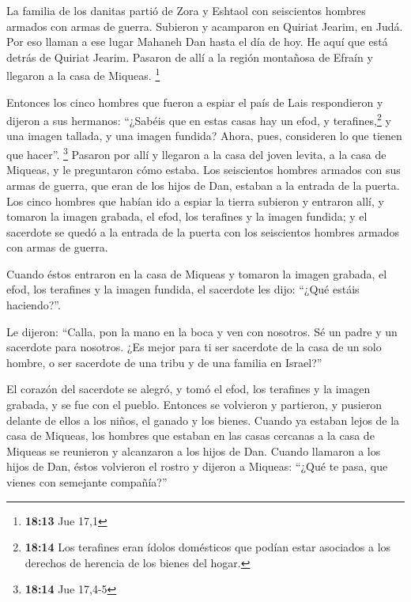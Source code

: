 \begin{paracol}{2}
 La familia de los danitas partió de Zora y Eshtaol con
seiscientos hombres armados con armas de guerra. 
Subieron y acamparon en Quiriat Jearim, en Judá. Por eso llaman a ese
lugar Mahaneh Dan hasta el día de hoy. He aquí que está detrás de
Quiriat Jearim.  Pasaron de allí a la región montañosa de
Efraín y llegaron a la casa de Miqueas. \footnote{\textbf{18:13} Jue
  17,1}

 Entonces los cinco hombres que fueron a espiar el país
de Lais respondieron y dijeron a sus hermanos: ``¿Sabéis que en estas
casas hay un efod, y terafines,\footnote{\textbf{18:14} Los terafines
  eran ídolos domésticos que podían estar asociados a los derechos de
  herencia de los bienes del hogar.} y una imagen tallada, y una imagen
fundida? Ahora, pues, consideren lo que tienen que hacer''. \footnote{\textbf{18:14}
  Jue 17,4-5}  Pasaron por allí y llegaron a la casa del
joven levita, a la casa de Miqueas, y le preguntaron cómo estaba.
 Los seiscientos hombres armados con sus armas de guerra,
que eran de los hijos de Dan, estaban a la entrada de la puerta.
 Los cinco hombres que habían ido a espiar la tierra
subieron y entraron allí, y tomaron la imagen grabada, el efod, los
terafines y la imagen fundida; y el sacerdote se quedó a la entrada de
la puerta con los seiscientos hombres armados con armas de guerra.

 Cuando éstos entraron en la casa de Miqueas y tomaron la
imagen grabada, el efod, los terafines y la imagen fundida, el sacerdote
les dijo: ``¿Qué estáis haciendo?''.

 Le dijeron: ``Calla, pon la mano en la boca y ven con
nosotros. Sé un padre y un sacerdote para nosotros. ¿Es mejor para ti
ser sacerdote de la casa de un solo hombre, o ser sacerdote de una tribu
y de una familia en Israel?''

 El corazón del sacerdote se alegró, y tomó el efod, los
terafines y la imagen grabada, y se fue con el pueblo. 
Entonces se volvieron y partieron, y pusieron delante de ellos a los
niños, el ganado y los bienes.  Cuando ya estaban lejos
de la casa de Miqueas, los hombres que estaban en las casas cercanas a
la casa de Miqueas se reunieron y alcanzaron a los hijos de Dan.
 Cuando llamaron a los hijos de Dan, éstos volvieron el
rostro y dijeron a Miqueas: ``¿Qué te pasa, que vienes con semejante
compañía?''


\end{paracol}
